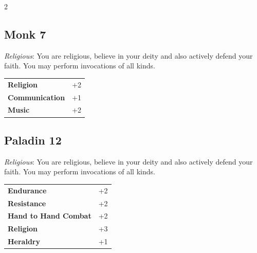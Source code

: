 \begin{multicols}{2}
\begin{tcolorbox}

\end{tcolorbox}

\begin{tcolorbox}
    \subsection*{Monk \hfill \small{7 }}
    \tcblower
\textit{Religious}: You are religious, believe in your deity and also actively defend your faith. You may perform invocations of all kinds.


\vspace{3mm}

\begin{tabular}{@{}ll@{}}
    \textbf{Religion} & +2\\
    \textbf{Communication} & +1\\
    \textbf{Music} & +2\\
\end{tabular}


\end{tcolorbox}

\begin{tcolorbox}
    \subsection*{Paladin \hfill \small{12 }}
    \tcblower
\textit{Religious}: You are religious, believe in your deity and also actively defend your faith. You may perform invocations of all kinds.


\vspace{3mm}

\begin{tabular}{@{}ll@{}}
    \textbf{Endurance} & +2\\
    \textbf{Resistance} & +2\\
    \textbf{Hand to Hand Combat} & +2\\
    \textbf{Religion} & +3\\
    \textbf{Heraldry} & +1\\
\end{tabular}


\end{tcolorbox}
\end{multicols}
